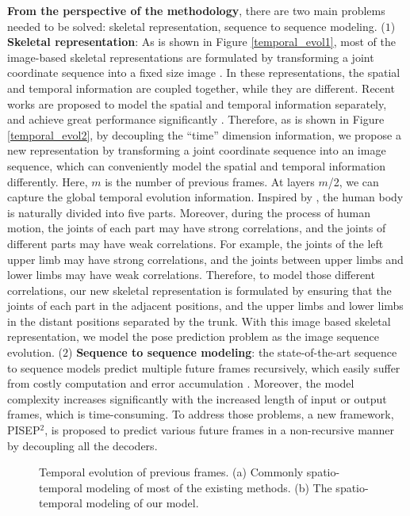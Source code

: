 \documentclass[journal]{IEEEtran}
\begin{document}
{\bf From the perspective of the methodology}, there are two main problems needed to be solved: skeletal representation, sequence to sequence modeling. (${1}$) {\bf Skeletal representation}: As is shown in Figure \ref{temporal_evol1}, most of the image-based skeletal representations are formulated by transforming a joint coordinate sequence into a fixed size image \cite{Kenew,ChaoHCN,DuSAR,skecnn2017,jdmcnn,rltdsbar,lcrsbar,vihar3dbio}. In these representations, the spatial and temporal information are coupled together, while they are different. Recent works are proposed to model the spatial and temporal information separately, and achieve great performance significantly \cite{timeception,tscnn,rstfl,arnvc,s21nar}. Therefore, as is shown in Figure \ref{temporal_evol2}, by decoupling the ``time'' dimension information, we propose a new representation by transforming a joint coordinate sequence into an image sequence, which can conveniently model the spatial and temporal   information differently. Here, ${m}$ is the number of previous frames. At layers ${m}$/2, we can capture the global temporal evolution information. Inspired by \cite{srnnar2015,biodsf2013}, the human body is naturally divided into five parts. Moreover, during the process of human motion, the joints of each part may have strong correlations, and the joints of different parts may have weak correlations. For example, the joints of the left upper limb may have strong correlations, and the joints between upper limbs and lower limbs may have weak correlations. Therefore, to model those different correlations, our new skeletal representation is formulated by ensuring that the joints of each part in the adjacent positions, and the upper limbs and lower limbs in the distant positions separated by the trunk. With this image based skeletal representation, we model the pose prediction problem as the image sequence evolution. (${2}$) {\bf Sequence to sequence modeling}: the state-of-the-art sequence to sequence models predict multiple future frames recursively, which easily suffer from costly computation and error accumulation \cite{predcnn,MartinezOMP,Guifewshot,predrnn}. Moreover, the model complexity increases significantly with the increased length of input or output frames, which is time-consuming. To address those problems, a new framework, PISEP${^2}$, is proposed to predict various future frames in a non-recursive manner by decoupling all the decoders.


\begin{figure}[!t]
\centering
{}
\hfil
{}
\caption{Temporal evolution of previous frames. (a) Commonly spatio-temporal modeling of most of the existing methods. (b) The spatio-temporal modeling of our model.}
\label{temporal_evol}
\end{figure}
\end{document}
